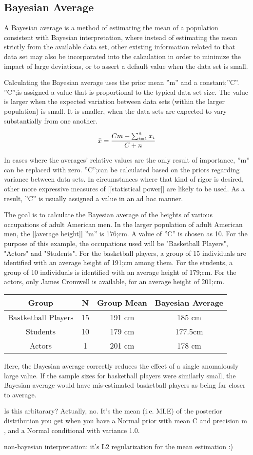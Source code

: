 \subsection{Bayesian Average}
A Bayesian average is a method of estimating the mean of a population consistent with Bayesian interpretation, where instead of estimating the mean strictly from the available data set, other existing information related to that data set may also be incorporated into the calculation in order to minimize the impact of large deviations, or to assert a default value when the data set is small.

Calculating the Bayesian average uses the prior mean ''m'' and a constant;''C''. ''C'';is assigned a value that is proportional to the typical data set size. The value is larger when the expected variation between data sets (within the larger population) is small. It is smaller, when the data sets are expected to vary substantially from one another.

\[  \bar{x} = {Cm + \sum_{i=1}^n{x_i} \over C + n}  \]

In cases where the averages' relative values are the only result of importance, ''m'' can be replaced with zero. ''C'';can be calculated based on the priors regarding variance between data sets. In circumstances where that kind of rigor is desired, other more expressive measures of [[statistical power]] are likely to be used. As a result, ''C'' is usually assigned a value in an ad hoc manner.

The goal is to calculate the Bayesian average of the heights of various occupations of adult American men. In the larger population of adult American men, the [[average height]] ''m'' is 176;cm. A value of ''C'' is chosen as 10. For the purpose of this example, the occupations used will be "Basketball Players", "Actors" and "Students". For the basketball players, a group of 15 individuals are identified with an average height of 191;cm among them. For the students, a group of 10 individuals is identified with an average height of 179;cm. For the actors, only James Cromwell is available, for an average height of 201;cm.


\begin{tabular}{|c|c|c|c|}
	\hline Group & N & Group Mean & Bayesian Average \\ 
	\hline Bastketball Players & 15 & 191 cm & 185 cm \\ 
	\hline Students & 10 & 179 cm & 177.5cm \\ 
	\hline Actors & 1 & 201 cm & 178 cm \\ 
	\hline 
\end{tabular} 
Here, the Bayesian average correctly reduces the effect of a single anomalously large value. If the sample sizes for basketball players were similarly small, the Bayesian average would have mis-estimated basketball players as being far closer to average.

Is this arbitarary? Actually, no. It’s the mean (i.e. MLE) of the posterior distribution you get when you have a Normal prior with mean C  and precision m , and a Normal conditional with variance 1.0.


non-bayesian interpretation: it’s L2 regularization for the mean estimation :)

